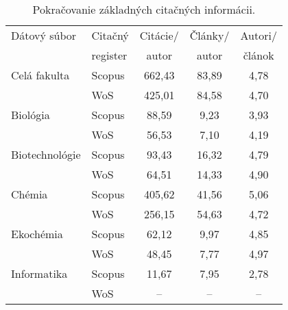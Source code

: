 \begin{table}
\centering\small
\caption{Pokračovanie základných citačných informácii.}
\label{tab:citation.info2}
\begin{tabular}{llccc}
  \hline\noalign{\vspace{.3ex}}
  Dátový súbor & Citačný  & Citácie/ & Články/ & Autori/ \\
               & register & autor    & autor   & článok  \\[0.3ex]
  \hline\noalign{\vspace{.5ex}}
  Celá fakulta   & Scopus & 662,43 & 83,89 & 4,78 \\
                 & WoS    & 425,01 & 84,58 & 4,70 \\[1ex]
  Biológia       & Scopus &  88,59 &  9,23 & 3,93 \\
                 & WoS    &  56,53 &  7,10 & 4,19 \\[1ex]
  Biotechnológie & Scopus &  93,43 & 16,32 & 4,79 \\
                 & WoS    &  64,51 & 14,33 & 4,90 \\[1ex]
  Chémia         & Scopus & 405,62 & 41,56 & 5,06 \\
                 & WoS    & 256,15 & 54,63 & 4,72 \\[1ex]
  Ekochémia      & Scopus &  62,12 &  9,97 & 4,85 \\
                 & WoS    &  48,45 &  7,77 & 4,97 \\[1ex]
  Informatika    & Scopus &  11,67 &  7,95 & 2,78 \\
                 & WoS    &  --    & --    & --   \\[0.5ex]
  \hline
\end{tabular}
\end{table}

